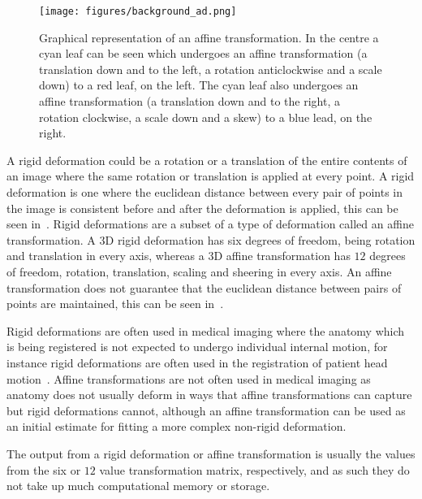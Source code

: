                 \begin{figure}
                    \centering
                    
                    \texttt{[image: figures/background\_ad.png]}
                    
                    \captionsetup{singlelinecheck=false, justification=raggedright}
                    \caption{Graphical representation of an affine transformation. In the centre a cyan leaf can be seen which undergoes an affine transformation (a translation down and to the left, a rotation anticlockwise and a scale down) to a red leaf, on the left. The cyan leaf also undergoes an affine transformation (a translation down and to the right, a rotation clockwise, a scale down and a skew) to a blue lead, on the right.} \label{fig:rigid_transformations_ad}
                \end{figure}
                
                A rigid deformation could be a rotation or a translation of the entire contents of an image where the same rotation or translation is applied at every point. A rigid deformation is one where the euclidean distance between every pair of points in the image is consistent before and after the deformation is applied, this can be seen in~. Rigid deformations are a subset of a type of deformation called an affine transformation. A \gls{3D} rigid deformation has six degrees of freedom, being rotation and translation in every axis, whereas a \gls{3D} affine transformation has $12$ degrees of freedom, rotation, translation, scaling and sheering in every axis. An affine transformation does not guarantee that the euclidean distance between pairs of points are maintained, this can be seen in~.
                
                Rigid deformations are often used in medical imaging where the anatomy which is being registered is not expected to undergo individual internal motion, for instance rigid deformations are often used in the registration of patient head motion~\parencite{Hill2001}. Affine transformations are not often used in medical imaging as anatomy does not usually deform in ways that affine transformations can capture but rigid deformations cannot, although an affine transformation can be used as an initial estimate for fitting a more complex non-rigid deformation.
                
                The output from a rigid deformation or affine transformation is usually the values from the six or $12$ value transformation matrix, respectively, and as such they do not take up much computational memory or storage.
                
